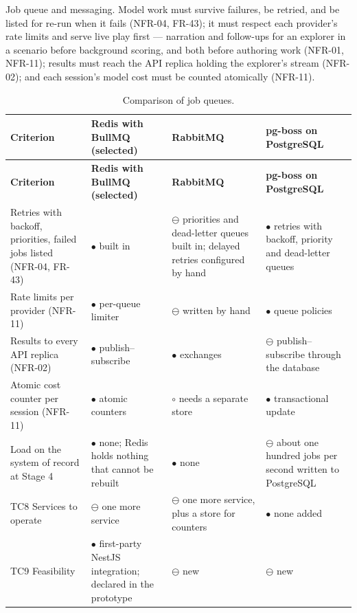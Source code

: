 Job queue and messaging. Model work must survive failures, be retried, and be listed for re-run when it fails (NFR-04, FR-43); it must respect each provider's rate limits and serve live play first --- narration and follow-ups for an explorer in a scenario before background scoring, and both before authoring work (NFR-01, NFR-11); results must reach the API replica holding the explorer's stream (NFR-02); and each session's model cost must be counted atomically (NFR-11).

{\small
\begin{longtable}{|>{\raggedright\arraybackslash}p{}|>{\raggedright\arraybackslash}p{}|>{\raggedright\arraybackslash}p{}|>{\raggedright\arraybackslash}p{}|}
\caption{Comparison of job queues.} \\
\hline
\textbf{Criterion} & \textbf{Redis with BullMQ (selected)} & \textbf{RabbitMQ\cite{r184}} & \textbf{pg-boss on PostgreSQL\cite{r185}} \\ \hline
\endfirsthead
\hline
\textbf{Criterion} & \textbf{Redis with BullMQ (selected)} & \textbf{RabbitMQ\cite{r184}} & \textbf{pg-boss on PostgreSQL\cite{r185}} \\ \hline
\endhead
Retries with backoff, priorities, failed jobs listed (NFR-04, FR-43) & $\bullet$ built in\cite{r154} & $\ominus$ priorities and dead-letter queues built in; delayed retries configured by hand & $\bullet$ retries with backoff, priority and dead-letter queues \\ \hline
Rate limits per provider (NFR-11) & $\bullet$ per-queue limiter & $\ominus$ written by hand & $\bullet$ queue policies \\ \hline
Results to every API replica (NFR-02) & $\bullet$ publish--subscribe & $\bullet$ exchanges & $\ominus$ publish--subscribe through the database \\ \hline
Atomic cost counter per session (NFR-11) & $\bullet$ atomic counters & $\circ$ needs a separate store & $\bullet$ transactional update \\ \hline
Load on the system of record at Stage 4 & $\bullet$ none; Redis holds nothing that cannot be rebuilt & $\bullet$ none & $\ominus$ about one hundred jobs per second written to PostgreSQL \\ \hline
TC8 Services to operate & $\ominus$ one more service & $\ominus$ one more service, plus a store for counters & $\bullet$ none added \\ \hline
TC9 Feasibility & $\bullet$ first-party NestJS integration\cite{r149}; declared in the prototype & $\ominus$ new & $\ominus$ new \\ \hline
\end{longtable}
}

